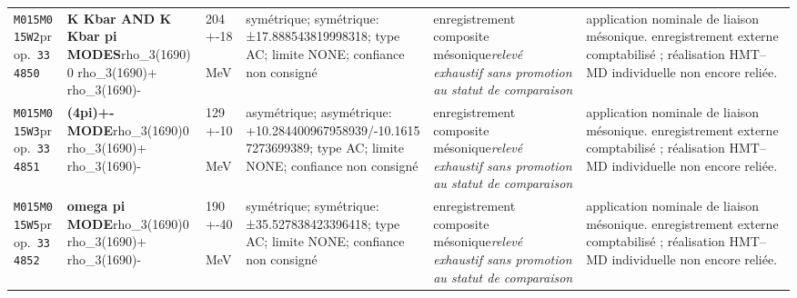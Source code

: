\begin{landscape}
\begin{longtable}{L{1.85cm}L{4.45cm}L{2.35cm}L{4.05cm}L{3.35cm}L{7.15cm}}
\texttt{M015}\newline \texttt{M015W2}\newline prop.\ \texttt{334850} & \textbf{K Kbar AND K Kbar pi MODES}\newline rho\_\allowbreak{}3(1690)0 \textbar{}\allowbreak{} rho\_\allowbreak{}3(1690)+ \textbar{}\allowbreak{} rho\_\allowbreak{}3(1690)- & 204+-18\,MeV & symétrique; symétrique: ±17.888543819998318; type AC; limite NONE; confiance non consigné & enregistrement composite mésonique\newline \emph{relevé exhaustif sans promotion au statut de comparaison} & application nominale de liaison mésonique. enregistrement externe comptabilisé ; réalisation HMT--MD individuelle non encore reliée. \\
\texttt{M015}\newline \texttt{M015W3}\newline prop.\ \texttt{334851} & \textbf{(4pi)+- MODE}\newline rho\_\allowbreak{}3(1690)0 \textbar{}\allowbreak{} rho\_\allowbreak{}3(1690)+ \textbar{}\allowbreak{} rho\_\allowbreak{}3(1690)- & 129+-10\,MeV & asymétrique; asymétrique: +10.284400967958939/-10.16157273699389; type AC; limite NONE; confiance non consigné & enregistrement composite mésonique\newline \emph{relevé exhaustif sans promotion au statut de comparaison} & application nominale de liaison mésonique. enregistrement externe comptabilisé ; réalisation HMT--MD individuelle non encore reliée. \\
\texttt{M015}\newline \texttt{M015W5}\newline prop.\ \texttt{334852} & \textbf{omega pi MODE}\newline rho\_\allowbreak{}3(1690)0 \textbar{}\allowbreak{} rho\_\allowbreak{}3(1690)+ \textbar{}\allowbreak{} rho\_\allowbreak{}3(1690)- & 190+-40\,MeV & symétrique; symétrique: ±35.527838423396418; type AC; limite NONE; confiance non consigné & enregistrement composite mésonique\newline \emph{relevé exhaustif sans promotion au statut de comparaison} & application nominale de liaison mésonique. enregistrement externe comptabilisé ; réalisation HMT--MD individuelle non encore reliée. \\

\end{longtable}
\end{landscape}
